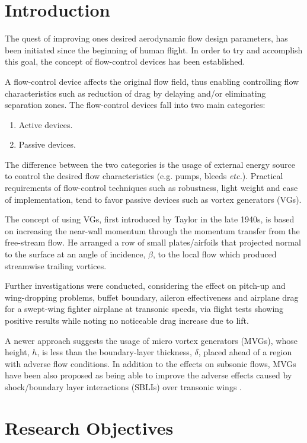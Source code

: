 \documentclass[10pt,a4paper]{article}
\begin{document}


\section{Introduction}
The quest of improving ones desired aerodynamic flow design parameters, has been initiated since the beginning of human flight. In order to try and accomplish this goal, the concept of flow-control devices has been established.
\par A flow-control device affects the original flow field, thus enabling controlling flow characteristics such as reduction of drag by delaying and/or eliminating separation zones.
The flow-control devices fall into two main categories:
\begin{enumerate}
	\item Active devices.
	\item Passive devices.
\end{enumerate}
The difference between the two categories is the usage of external energy source to control the desired flow characteristics (e.g. pumps, bleeds \textit{etc.}). Practical requirements of flow-control techniques such as robustness, light weight and ease of implementation, tend to favor passive devices such as vortex generators (VGs).\par
The concept of using VGs, first introduced by Taylor \cite{1} in the late 1940s, is based on increasing the near-wall momentum through the momentum transfer from the free-stream flow. He arranged a row of small plates/airfoils that projected normal to the surface at an angle of incidence, $\beta$, to the local flow which produced streamwise trailing vortices.\par 
Further investigations were conducted, considering the effect on pitch-up and wing-dropping problems, buffet boundary, aileron effectiveness and airplane drag for a swept-wing fighter airplane at transonic speeds, via flight tests \cite{2} showing positive results while noting no noticeable drag increase due to lift.\par
A newer approach suggests the usage of micro vortex generators (MVGs), whose height, $h$, is less than the boundary-layer thickness, $\delta$, placed ahead of a region with adverse flow conditions. In addition to the effects on subsonic flows, MVGs have been also proposed as being able to improve the adverse effects caused by shock/boundary layer interactions (SBLIs) over transonic wings \cite{3}. 
\section{Research Objectives}
\end{document}
